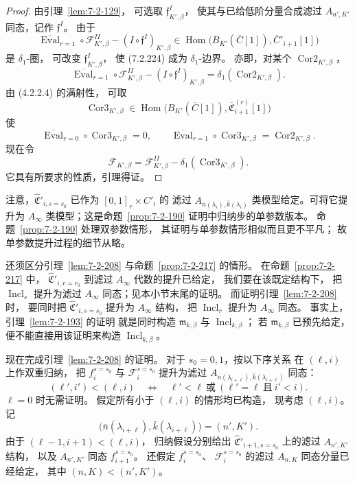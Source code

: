 \begin{proof}
由引理~\ref{lem:7-2-129}，
可选取 $\mathfrak f^I_{K',\beta}$，
使其与已给低阶分量合成滤过
$A_{n',K'}$ 同态，记作 $\mathfrak f^I$。
由于
\begin{equation}
\overline{\operatorname{Eval}}_{r=1}
\circ\mathcal F^{II}_{K',\beta}
-(I\circ\mathfrak f^I)_{K',\beta}
\in\operatorname{Hom}
\bigl(B_{K'}(\overline C[1]),
\overline C'_{i+1}[1]\bigr)
\tag{7.2.224}\label{eq:7-2-224}
\end{equation}
是 $\delta_1$-圈，
可改变 $\mathfrak f^I_{K',\beta}$，
使 (7.2.224) 成为 $\delta_1$-边界。
亦即，对某个 $\operatorname{Cor2}_{K',\beta}$，
\[
\overline{\operatorname{Eval}}_{r=1}
\circ\mathcal F^{II}_{K',\beta}
-(I\circ\mathfrak f^I)_{K',\beta}
=\delta_1(\operatorname{Cor2}_{K',\beta}).
\]
由 (4.2.2.4) 的满射性，
可取
\[
\operatorname{Cor3}_{K',\beta}
\in\operatorname{Hom}
\bigl(B_{K'}(\overline C[1]),
\overline{\mathfrak C}_{i+1}^{(r)}[1]\bigr)
\]
使
\[
\overline{\operatorname{Eval}}_{r=0}
\circ\operatorname{Cor3}_{K',\beta}=0,
\qquad
\overline{\operatorname{Eval}}_{r=1}
\circ\operatorname{Cor3}_{K',\beta}
=\operatorname{Cor2}_{K',\beta}.
\]
现在令
\[
\mathcal F_{K',\beta}
=\mathcal F^{II}_{K',\beta}
-\delta_1(\operatorname{Cor3}_{K',\beta}).
\]
它具有所要求的性质，引理得证。
\end{proof}

注意，$\widehat{\mathfrak C}'_{i,s=s_0}$
已作为 $[0,1]_r\times C'_i$ 的
滤过 $A_{\bar n(\lambda_i),\bar k(\lambda_i)}$
类模型给定。可将它提升为
$A_\infty$ 类模型；这是命题~\ref{prop:7-2-190}
证明中归纳步的单参数版本。
命题~\ref{prop:7-2-190} 处理双参数情形，
其证明与单参数情形相似而且更不平凡；
故单参数提升过程的细节从略。

还须区分引理~\ref{lem:7-2-208}
与命题~\ref{prop:7-2-217} 的情形。
在命题~\ref{prop:7-2-217} 中，
$\widehat{\mathfrak C}'_{i,r=r_0}$
到滤过 $A_\infty$ 代数的提升已给定，
我们要在该既定结构下，
把 $\operatorname{Incl}_s$ 提升为滤过
$A_\infty$ 同态；见本小节末尾的证明。
而证明引理~\ref{lem:7-2-208} 时，
要同时把
$\widehat{\mathfrak C}'_{i,s=s_0}$
提升为 $A_\infty$ 结构，
把 $\operatorname{Incl}_r$ 提升为
$A_\infty$ 同态。
事实上，引理~\ref{lem:7-2-193} 的证明
就是同时构造 $\mathfrak m_{k,\beta}$
与 $\operatorname{Incl}_{k,\beta}$；
若 $\mathfrak m_{k,\beta}$ 已预先给定，
便不能直接用该证明来构造
$\operatorname{Incl}_{k,\beta}$。

现在完成引理~\ref{lem:7-2-208} 的证明。
对于 $s_0=0,1$，按以下序关系
在 $(\ell,i)$ 上作双重归纳，
把 $f_i^{s=s_0}$ 与
$\mathcal F_i^{s=s_0}$
提升为滤过
$A_{\bar n(\lambda_{i+\ell}),
\bar k(\lambda_{i+\ell})}$ 同态：
\[
(\ell',i')<(\ell,i)
\quad\Longleftrightarrow\quad
\ell'<\ell\ \text{或}\ 
(\ell'=\ell\ \text{且}\ i'<i).
\]
$\ell=0$ 时无需证明。
假定所有小于 $(\ell,i)$ 的情形均已构造，
现考虑 $(\ell,i)$。
记
\[
\bigl(\bar n(\lambda_{i+\ell}),
\bar k(\lambda_{i+\ell})\bigr)
=(n',K').
\]
由于 $(\ell-1,i+1)<(\ell,i)$，
归纳假设分别给出
$\widehat{\mathfrak C}'_{i+1,s=s_0}$
上的滤过 $A_{n',K'}$ 结构，
以及 $A_{n',K'}$ 同态
$f_{i+1}^{s=s_0}$。
还假定 $f_i^{s=s_0}$、
$\mathcal F_i^{s=s_0}$
的滤过 $A_{n,K}$ 同态分量已经给定，
其中 $(n,K)<(n',K')$。

